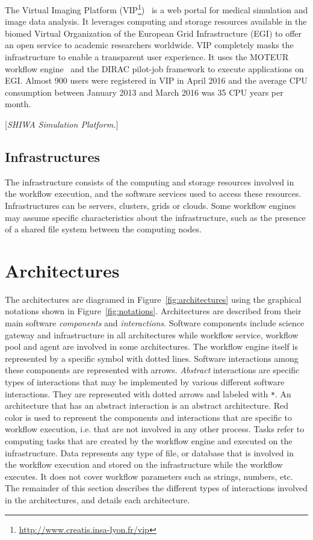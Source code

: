 \documentclass[preprint,3p,twocolumn]{elsarticle}
\newcommand{\todo}[1]{\color{blue}\xspace[\emph{#1}]\xspace\color{black}}
\begin{document}
The Virtual Imaging Platform
(VIP\footnote{\url{http://www.creatis.insa-lyon.fr/vip}})~\cite{GLAT-13}
is a web portal for medical simulation and image data analysis. It
leverages computing and storage resources available in the biomed
Virtual Organization of the European Grid Infrastructure (EGI) to
offer an open service to academic researchers worldwide. VIP
completely masks the infrastructure to enable a transparent user
experience. It uses the MOTEUR workflow engine~\cite{GLAT-13} and the
DIRAC pilot-job framework to execute applications on EGI. Almost 900
users were registered in VIP in April 2016 and the average CPU
consumption between January 2013 and March 2016 was 35 CPU years per
month.

\todo{SHIWA Simulation Platform.}

\subsection{Infrastructures}


The infrastructure consists of the computing and storage resources
involved in the workflow execution, and the software services used to
access these resources. Infrastructures can be servers, clusters,
grids or clouds. Some workflow engines may assume specific
characteristics about the infrastructure, such as the presence of a
shared file system between the computing nodes.

\section{Architectures}
\label{sec:architectures}

The architectures are diagramed in Figure~\ref{fig:architectures}
using the graphical notations shown in
Figure~\ref{fig:notations}. Architectures are described from their
main software \emph{components} and \emph{interactions}. Software
components include science gateway and infrastructure in all
architectures while workflow service, workflow pool and agent are
involved in some architectures. The workflow engine itself is
represented by a specific symbol with dotted lines. Software
interactions among these components are represented with
arrows. \emph{Abstract} interactions are specific types of
interactions that may be implemented by various different software
interactions. They are represented with dotted arrows and labeled with
 \texttt{*}. An architecture that has an abstract interaction is an
abstract architecture. Red color is used to represent the components
and interactions that are specific to workflow execution, i.e. that
are not involved in any other process. Tasks refer to computing tasks
that are created by the workflow engine and executed on the
infrastructure. Data represents any type of file, or database that is
involved in the workflow execution and stored on the infrastructure
while the workflow executes. It does not cover workflow parameters
such as strings, numbers, etc. The remainder of this section describes
the different types of interactions involved in the architectures, and
details each architecture.
\end{document}
